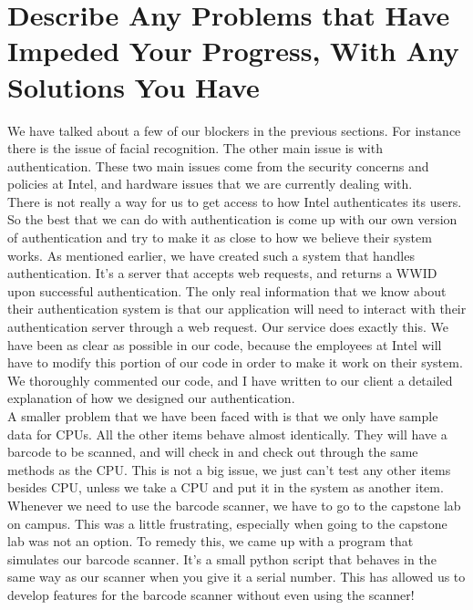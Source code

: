 \documentclass[10pt, onecolumn, twoside, peerreview]{IEEEtran}
\begin{document}
\section{Describe Any Problems that Have Impeded Your Progress, With Any
Solutions You Have}

We have talked about a few of our blockers in the previous
sections. For instance there is the issue of facial recognition. The other main
issue is with authentication. These two main issues come from the security
concerns and policies at Intel, and hardware issues that we are currently dealing with.\\

There is not really a way for us to get access to how Intel authenticates its
users. So the best that we can do with authentication is come up with our own
version of authentication and try to make it as close to how we believe their
system works. As mentioned earlier, we have created such a system that handles
authentication. It's a server that accepts web requests, and returns a WWID
upon successful authentication. The only real information that we know about
their authentication system is that our application will need to interact with
their authentication server through a web request. Our service does exactly
this. We have been as clear as possible in our code, because the employees at
Intel will have to modify this portion of our code in order to make it work on
their system. We thoroughly commented our code, and I have written to our
client a detailed explanation of how we designed our authentication.\\

A smaller problem that we have been faced with is that we only have sample data
for CPUs. All the other items behave almost identically. They will have a
barcode to be scanned, and will check in and check out through the same methods
as the CPU. This is not a big issue, we just can't test any other items besides
CPU, unless we take a CPU and put it in the system as another item.\\

Whenever we need to use the barcode scanner, we have to go to the capstone lab
on campus. This was a little frustrating, especially when going to the capstone
lab was not an option. To remedy this, we came up with a program that simulates
our barcode scanner. It's a small python script that behaves in the same way as
our scanner when you give it a serial number. This has allowed us to develop
features for the barcode scanner without even using the scanner!
\end{document}
